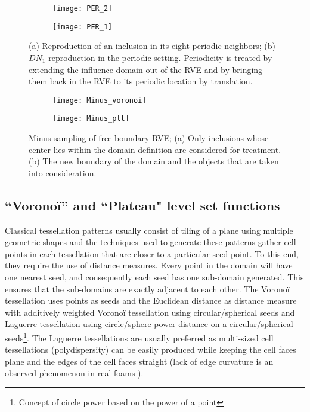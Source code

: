\begin{figure}
	\centering
	\begin{subfigure}[b]{0.32\textwidth}
		\texttt{[image: PER\_2]}
		\caption{}
	\end{subfigure}
	\begin{subfigure}[b]{0.32\textwidth}
		\texttt{[image: PER\_1]}
		\caption{}
	\end{subfigure}
	\caption{(a) Reproduction of an inclusion in its eight periodic neighbors; (b) $DN_1$ reproduction in the periodic setting. Periodicity is treated by extending the influence domain out of the RVE and by bringing them back in the RVE to its periodic location by translation.}\label{periodic}
\end{figure}

\begin{figure}
	\centering
	\begin{subfigure}[b]{0.32\textwidth}
		\texttt{[image: Minus\_voronoi]}
		\caption{}
	\end{subfigure}
	\begin{subfigure}[b]{0.327\textwidth}
		\texttt{[image: Minus\_plt]}
		\caption{}
	\end{subfigure}
	\caption{Minus sampling of free boundary RVE; (a) Only inclusions whose center lies within the domain definition are considered for treatment. (b) The new boundary of the domain and the objects that are taken into consideration.}\label{free}
\end{figure}

\subsection{``Vorono\"i'' and ``Plateau" level set functions}\label{of-gen-ov}
Classical tessellation patterns usually consist of tiling of a plane using multiple geometric shapes and the techniques used to generate these patterns gather cell points in each tessellation that are closer to a particular seed point. To this end, they require the use of distance measures. Every point in the domain will have one nearest seed, and consequently each seed has one sub-domain generated. This ensures that the sub-domains are exactly adjacent to each other. The Vorono\"i tessellation uses points as seeds and the Euclidean distance as distance measure with additively weighted Vorono\"i tessellation using circular/spherical seeds and Laguerre tessellation using circle/sphere power distance on a circular/spherical seeds\footnote{Concept of circle power based on the power of a point\cite{coxeterIntroductionGeometry1969}}. 
The Laguerre tessellations are usually preferred as multi-sized cell tessellations (polydispersity) can be easily produced while keeping the cell faces plane and the edges of the cell faces straight (lack of edge curvature is an observed phenomenon in real foams \cite{andrewsCompressiveTensileBehaviour1999}).

